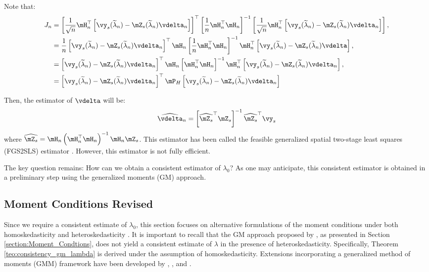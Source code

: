 \documentclass[english,12pt]{book}\usepackage[]{graphicx}\usepackage[]{xcolor}
\begin{document}
Note that:
\begin{equation*}
  \begin{aligned}
 J_n & = \left[\frac{1}{\sqrt{n}}\mH^\top_n\left[\vy_s(\widetilde{\lambda}_n) - \mZ_s(\widetilde{\lambda}_n)\vdelta_n\right]\right]^\top \left[\frac{1}{n}\mH^\top_n\mH_n\right]^{-1}\left[\frac{1}{\sqrt{n}}\mH^\top_n\left[\vy_s(\widetilde{\lambda}_n) - \mZ_s(\widetilde{\lambda}_n)\vdelta_n\right]\right], \\
     & = \frac{1}{n}\left[\vy_s(\widetilde{\lambda}_n) - \mZ_s(\widetilde{\lambda}_n)\vdelta_n\right]^\top \mH_n\left[\frac{1}{n}\mH_n^\top\mH_n\right]^{-1}\mH_n^\top \left[\vy_s(\widetilde{\lambda}_n) - \mZ_s(\widetilde{\lambda}_n)\vdelta\right], \\
     & = \left[\vy_s(\widetilde{\lambda}_n) - \mZ_s(\widetilde{\lambda}_n)\vdelta_n\right]^\top \mH_n\left[\mH_n^\top\mH_n\right]^{-1}\mH_n^\top \left[\vy_s(\widetilde{\lambda}_n) - \mZ_s(\widetilde{\lambda}_n)\vdelta_n\right], \\
     & = \left[\vy_s(\widetilde{\lambda}_n) - \mZ_s(\widetilde{\lambda}_n)\vdelta_n\right]^\top \mP_H \left[\vy_s(\widetilde{\lambda}_n) - \mZ_s(\widetilde{\lambda}_n)\vdelta_n\right]
\end{aligned}
\end{equation*}

Then, the estimator of $\vdelta$ will be:
\begin{equation*}
  \widehat{\vdelta}_n = \left[\widehat{\mZ_s}^\top\mZ_s\right]^{-1}\widehat{\mZ_s}^\top\vy_s
\end{equation*}
%
where $\widehat{\mZ_s} = \mH_n\left(\mH_n^\top\mH_n\right)^{-1}\mH_n\mZ_s$. This estimator has been called the feasible generalized spatial two-stage least squares (FGS2SLS) estimator \citep{kelejian1998generalized}. However, this estimator is not fully efficient. 

The key question remains: How can we obtain a consistent estimator of $\lambda_0$? As one may anticipate, this consistent estimator is obtained in a preliminary step using the generalized moments (GM) approach.

\subsection{Moment Conditions Revised}

Since we require a consistent estimate of $\lambda_0$, this section focuses on alternative formulations of the moment conditions under both homoskedasticity \citep{kelejian1999generalized} and heteroskedasticity \citep{kelejian2010specification}. It is important to recall that the GM approach proposed by \cite{kelejian1999generalized}, as presented in Section \ref{section:Moment_Condtions}, does not yield a consistent estimate of $\lambda$ in the presence of heteroskedasticity. Specifically, Theorem \ref{teo:consistency_gm_lambda} is derived under the assumption of homoskedasticity. Extensions incorporating a generalized method of moments (GMM) framework have been developed by \cite{kelejian2010specification}, \cite{arraiz2010spatial}, and \cite{drukker2013two}.
\end{document}
